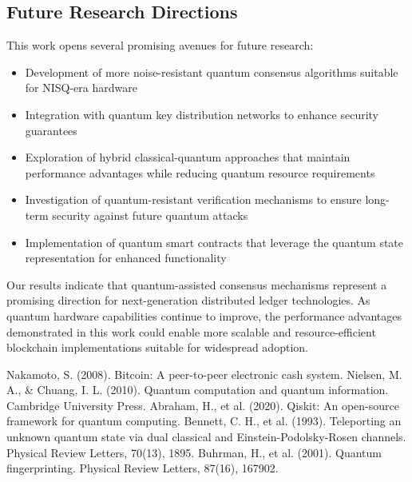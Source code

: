\documentclass[11pt,a4paper]{article}
\begin{document}
\subsection{Future Research Directions}
This work opens several promising avenues for future research:

\begin{itemize}
    \item Development of more noise-resistant quantum consensus algorithms suitable for NISQ-era hardware
    \item Integration with quantum key distribution networks to enhance security guarantees
    \item Exploration of hybrid classical-quantum approaches that maintain performance advantages while reducing quantum resource requirements
    \item Investigation of quantum-resistant verification mechanisms to ensure long-term security against future quantum attacks
    \item Implementation of quantum smart contracts that leverage the quantum state representation for enhanced functionality
\end{itemize}

Our results indicate that quantum-assisted consensus mechanisms represent a promising direction for next-generation distributed ledger technologies. As quantum hardware capabilities continue to improve, the performance advantages demonstrated in this work could enable more scalable and resource-efficient blockchain implementations suitable for widespread adoption.

\begin{thebibliography}{9}
Nakamoto, S. (2008). Bitcoin: A peer-to-peer electronic cash system.
Nielsen, M. A., \& Chuang, I. L. (2010). Quantum computation and quantum information. Cambridge University Press.
Abraham, H., et al. (2020). Qiskit: An open-source framework for quantum computing.
Bennett, C. H., et al. (1993). Teleporting an unknown quantum state via dual classical and Einstein-Podolsky-Rosen channels. Physical Review Letters, 70(13), 1895.
Buhrman, H., et al. (2001). Quantum fingerprinting. Physical Review Letters, 87(16), 167902.
\end{thebibliography}
\end{document}
